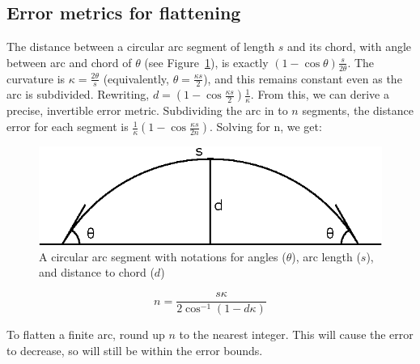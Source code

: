 \documentclass[sigconf, authordraft]{acmart}
\begin{document}

\subsection{Error metrics for flattening}

The distance between a circular arc segment of length $s$ and its chord, with angle between arc and chord of $\theta$ (see Figure~\ref{fig:arc_chord}), is exactly $(1-\cos \theta)\frac{s}{2\theta}$. The curvature is $\kappa = \frac{2\theta}{s}$ (equivalently, $\theta = \frac{\kappa s}{2}$), and this remains constant even as the arc is subdivided. Rewriting, $d = (1-\cos\frac{\kappa s}{2})\frac{1}{\kappa}$. From this, we can derive a precise, invertible error metric. Subdividing the arc in to $n$ segments, the distance error for each segment is $\frac{1}{\kappa}(1-\cos \frac{\kappa s}{2n})$. Solving for n, we get:

\begin{figure}
    \includegraphics[scale=0.5]{arc_chord}
    \caption{A circular arc segment with notations for angles ($\theta$), arc length ($s$), and distance to chord ($d$)}
    \label{fig:arc_chord}
\end{figure}


\[
n = \frac{s\kappa}{2\cos^{-1}\left( 1- d\kappa \right)}
\]

To flatten a finite arc, round up $n$ to the nearest integer. This will cause the error to decrease, so will still be within the error bounds.
\end{document}
